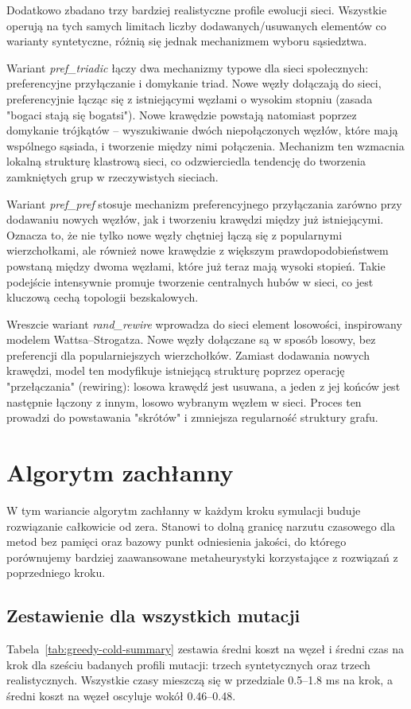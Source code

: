 Dodatkowo zbadano trzy bardziej realistyczne profile ewolucji sieci. Wszystkie operują na tych samych limitach liczby dodawanych/usuwanych elementów co warianty syntetyczne, różnią się jednak mechanizmem wyboru sąsiedztwa.

Wariant \emph{pref\_triadic} łączy dwa mechanizmy typowe dla sieci społecznych: preferencyjne przyłączanie i domykanie triad. Nowe węzły dołączają do sieci, preferencyjnie łącząc się z istniejącymi węzłami o wysokim stopniu (zasada "bogaci stają się bogatsi"). Nowe krawędzie powstają natomiast poprzez domykanie trójkątów -- wyszukiwanie dwóch niepołączonych węzłów, które mają wspólnego sąsiada, i tworzenie między nimi połączenia. Mechanizm ten wzmacnia lokalną strukturę klastrową sieci, co odzwierciedla tendencję do tworzenia zamkniętych grup w rzeczywistych sieciach.

Wariant \emph{pref\_pref} stosuje mechanizm preferencyjnego przyłączania zarówno przy dodawaniu nowych węzłów, jak i tworzeniu krawędzi między już istniejącymi. Oznacza to, że nie tylko nowe węzły chętniej łączą się z popularnymi wierzchołkami, ale również nowe krawędzie z większym prawdopodobieństwem powstaną między dwoma węzłami, które już teraz mają wysoki stopień. Takie podejście intensywnie promuje tworzenie centralnych hubów w sieci, co jest kluczową cechą topologii bezskalowych.

Wreszcie wariant \emph{rand\_rewire} wprowadza do sieci element losowości, inspirowany modelem Wattsa--Strogatza. Nowe węzły dołączane są w sposób losowy, bez preferencji dla popularniejszych wierzchołków. Zamiast dodawania nowych krawędzi, model ten modyfikuje istniejącą strukturę poprzez operację "przełączania" (rewiring): losowa krawędź jest usuwana, a jeden z jej końców jest następnie łączony z innym, losowo wybranym węzłem w sieci. Proces ten prowadzi do powstawania "skrótów" i zmniejsza regularność struktury grafu.


\section{Algorytm zachłanny}

W tym wariancie algorytm zachłanny w każdym kroku symulacji buduje rozwiązanie całkowicie od zera. Stanowi to dolną granicę narzutu czasowego dla metod bez pamięci oraz bazowy punkt odniesienia jakości, do którego porównujemy bardziej zaawansowane metaheurystyki korzystające z rozwiązań z poprzedniego kroku.

\subsection{Zestawienie dla wszystkich mutacji}
Tabela~\ref{tab:greedy-cold-summary} zestawia średni koszt na węzeł i średni czas na krok dla sześciu badanych profili mutacji: trzech syntetycznych oraz trzech realistycznych. Wszystkie czasy mieszczą się w przedziale 0.5--1.8 ms na krok, a średni koszt na węzeł oscyluje wokół 0.46--0.48.

